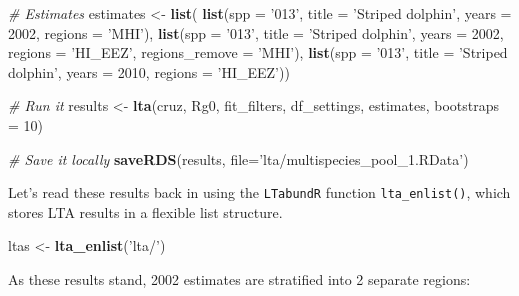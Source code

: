 \documentclass[
]{book}
\newenvironment{Shaded}{\begin{snugshade}}{\end{snugshade}}
\newcommand{\CommentTok}[1]{\textcolor[rgb]{0.56,0.35,0.01}{\textit{#1}}}
\newcommand{\DataTypeTok}[1]{\textcolor[rgb]{0.13,0.29,0.53}{#1}}
\newcommand{\DecValTok}[1]{\textcolor[rgb]{0.00,0.00,0.81}{#1}}
\newcommand{\KeywordTok}[1]{\textcolor[rgb]{0.13,0.29,0.53}{\textbf{#1}}}
\newcommand{\NormalTok}[1]{#1}
\newcommand{\StringTok}[1]{\textcolor[rgb]{0.31,0.60,0.02}{#1}}
\begin{document}
\begin{Shaded}
\begin{Highlighting}[]
\CommentTok{# Estimates}
\NormalTok{estimates <-}\StringTok{ }\KeywordTok{list}\NormalTok{(}
    \KeywordTok{list}\NormalTok{(}\DataTypeTok{spp =} \StringTok{'013'}\NormalTok{,}
         \DataTypeTok{title =} \StringTok{'Striped dolphin'}\NormalTok{,}
         \DataTypeTok{years =} \DecValTok{2002}\NormalTok{,}
         \DataTypeTok{regions =} \StringTok{'MHI'}\NormalTok{),}
    \KeywordTok{list}\NormalTok{(}\DataTypeTok{spp =} \StringTok{'013'}\NormalTok{,}
         \DataTypeTok{title =} \StringTok{'Striped dolphin'}\NormalTok{,}
         \DataTypeTok{years =} \DecValTok{2002}\NormalTok{,}
         \DataTypeTok{regions =} \StringTok{'HI_EEZ'}\NormalTok{,}
         \DataTypeTok{regions_remove =} \StringTok{'MHI'}\NormalTok{),}
    \KeywordTok{list}\NormalTok{(}\DataTypeTok{spp =} \StringTok{'013'}\NormalTok{,}
         \DataTypeTok{title =} \StringTok{'Striped dolphin'}\NormalTok{,}
         \DataTypeTok{years =} \DecValTok{2010}\NormalTok{,}
         \DataTypeTok{regions =} \StringTok{'HI_EEZ'}\NormalTok{))}

\CommentTok{# Run it}
\NormalTok{results <-}\StringTok{ }\KeywordTok{lta}\NormalTok{(cruz, Rg0, }
\NormalTok{               fit_filters, df_settings, estimates, }
               \DataTypeTok{bootstraps =} \DecValTok{10}\NormalTok{)}

\CommentTok{# Save it locally}
\KeywordTok{saveRDS}\NormalTok{(results, }\DataTypeTok{file=}\StringTok{'lta/multispecies_pool_1.RData'}\NormalTok{)}
\end{Highlighting}
\end{Shaded}

Let's read these results back in using the \texttt{LTabundR} function \texttt{lta\_enlist()}, which stores LTA results in a flexible list structure.

\begin{Shaded}
\begin{Highlighting}[]
\NormalTok{ltas <-}\StringTok{ }\KeywordTok{lta_enlist}\NormalTok{(}\StringTok{'lta/'}\NormalTok{)}
\end{Highlighting}
\end{Shaded}

As these results stand, 2002 estimates are stratified into 2 separate regions:
\end{document}
